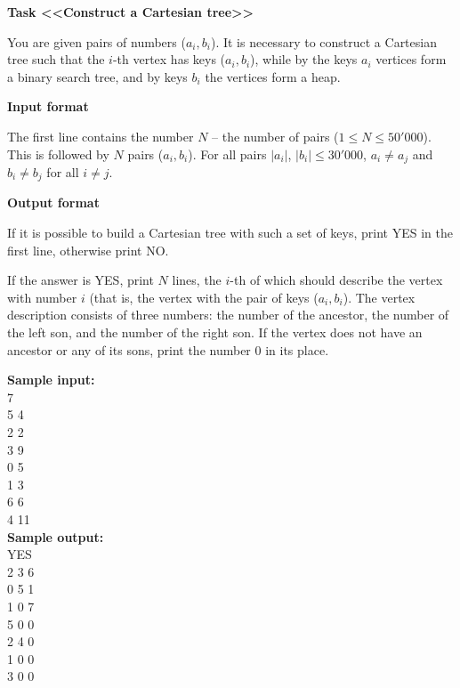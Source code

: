 \documentclass[a4paper]{article}
\begin{document}
\textbf{Task <<Construct a Cartesian tree>>}

You are given pairs of numbers ($a_i, b_i$). It is necessary to construct a Cartesian tree such that the $i$-th vertex has keys ($a_i, b_i$), while by the keys $a_i$ vertices form a binary search tree, and by keys $b_i$ the vertices form a heap.

\SPACE

\textbf{Input format}

The first line contains the number $N$ -- the number of pairs ($1 \le N \le 50'000$). This is followed by $N$ pairs ($a_i, b_i$). For all pairs $|a_i|$, $|b_i| \le 30'000$, $a_i \neq a_j$ and $b_i \neq b_j$ for all $i \neq j$.

\SPACE

\textbf{Output format}

If it is possible to build a Cartesian tree with such a set of keys, print YES in the first line, otherwise print NO.

If the answer is YES, print $N$ lines, the $i$-th of which should describe the vertex with number $i$ (that is, the vertex with the pair of keys ($a_i, b_i$). The vertex description consists of three numbers: the number of the ancestor, the number of the left son, and the number of the right son. If the vertex does not have an ancestor or any of its sons, print the number $0$ in its place.

\LINE

\noindent \textbf{Sample input:}\\
7\\
5 4\\
2 2\\
3 9\\
0 5\\
1 3\\
6 6\\
4 11\\

\noindent \textbf{Sample output:}\\
YES\\
2 3 6\\
0 5 1\\
1 0 7\\
5 0 0\\
2 4 0\\
1 0 0\\
3 0 0\\
\end{document}
